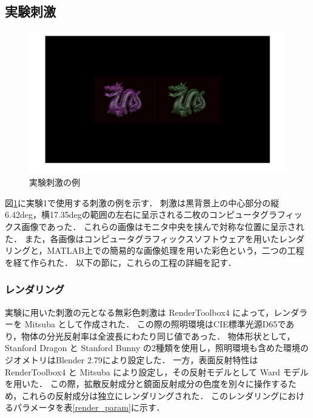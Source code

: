         \subsection{実験刺激}

            \begin{figure}[h]
                \centering
                \includegraphics[width=14.0cm]{./img/ex1_stimuli.png}
                \caption{実験刺激の例}
                \label{ex1_stimuli}
            \end{figure}

            図\ref{ex1_stimuli}に実験1で使用する刺激の例を示す．
            刺激は黒背景上の中心部分の縦6.42deg，横17.35degの範囲の左右に呈示される二枚のコンピュータグラフィックス画像であった．
            これらの画像はモニタ中央を挟んで対称な位置に呈示された．
            また，各画像はコンピュータグラフィックスソフトウェアを用いたレンダリングと，MATLAB上での簡易的な画像処理を用いた彩色という，二つの工程を経て作られた．
            以下の節に，これらの工程の詳細を記す．

            \subsubsection{レンダリング}

                実験に用いた刺激の元となる無彩色刺激は RenderToolbox4 によって，レンダラーを Mitsuba\cite{Mitsuba} として作成された．
                この際の照明環境はCIE標準光源D65であり，物体の分光反射率は全波長にわたり同じ値であった．
                物体形状として，Stanford Dragon と Stanford Bunny \cite{StanfordModels} の2種類を使用し，照明環境も含めた環境のジオメトリはBlender 2.79により設定した．
                一方，表面反射特性は RenderToolbox4 と Mitsuba により設定し，その反射モデルとして Ward モデル\cite{Ward}を用いた．
                この際，拡散反射成分と鏡面反射成分の色度を別々に操作するため，これらの反射成分は独立にレンダリングされた．
                このレンダリングにおけるパラメータを表\ref{render_param}に示す．

